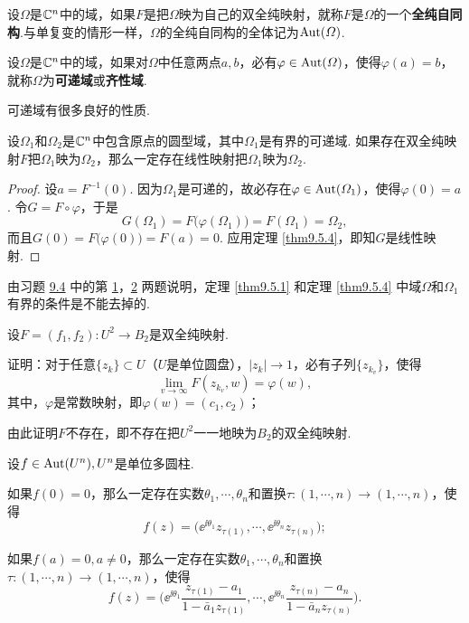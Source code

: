 设$\Omega$是$\mathbb C^n$中的域，如果$F$是把$\Omega$映为自己的双全纯映射，就称$F$是$\Omega$的一个\textbf{全纯自同构}.与单复变的情形一样，$\Omega$的全纯自同构的全体记为$\operatorname{Aut}(\varOmega)$.
\begin{definition}\label{def9.5.5}
设$\Omega$是$\mathbb C^n$中的域，如果对$\Omega$中任意两点$a,b$，必有$\varphi\in\operatorname{Aut}(\varOmega)$，使得$\varphi(a)=b$，就称$\Omega$为\textbf{可递域}或\textbf{齐性域}.
\end{definition}

可递域有很多良好的性质.
\begin{theorem}\label{thm9.5.6}
设$\Omega_1$和$\Omega_2$是$\mathbb C^n$中包含原点的圆型域，其中$\Omega_1$是有界的可递域. 如果存在双全纯映射$F$把$\Omega_1$映为$\Omega_2$，那么一定存在线性映射把$\Omega_1$映为$\Omega_2$.
\end{theorem}
\begin{proof}
设$a=F^{-1}(0)$. 因为$\Omega_1$是可递的，故必存在$\varphi\in\operatorname{Aut}(\varOmega_1)$，使得$\varphi(0)=a$. 令$G=F\circ \varphi$，于是
\[G(\Omega_1)=F\big(\varphi(\Omega_1)\big)=F(\Omega_1)=\Omega_2,\]
而且$G(0)=F\big(\varphi(0)\big)=F(a)=0$. 应用定理 \ref{thm9.5.4}，即知$G$是线性映射.
\end{proof}

\begin{xiti}
\item 由习题  \hyperlink{xiti9.4}{9.4} 中的第 \hyperlink{xiti9.4.1}{1}，\hyperlink{xiti9.4.2}{2} 两题说明，定理 \ref{thm9.5.1} 和定理 \ref{thm9.5.4} 中域$\Omega$和$\Omega_1$有界的条件是不能去掉的.
\item 设$F=(f_1,f_2):U^2\to B_2$是双全纯映射.
\begin{enuma}
  \item 证明：对于任意$\{z_k\}\subset U$（$U$是单位圆盘），$|z_k|\to1$，必有子列$\{z_{k_v}\}$，使得
      \[\lim_{v\to\infty}F(z_{k_v},w)=\varphi(w),\]
  其中，$\varphi$是常数映射，即$\varphi(w)=(c_1,c_2)$；
  \item 由此证明$F$不存在，即不存在把$U^2$一一地映为$B_2$的双全纯映射.
\end{enuma}
\item 设$f\in\operatorname{Aut}(U^n),U^n$是单位多圆柱.
\begin{enuma}
  \item 如果$f(0)=0$，那么一定存在实数$\theta_1,\cdots,\theta_n$和置换$\tau:(1,\cdots,n)\to(1,\cdots,n)$，使得
      \[f(z)=\big(\ee^{\ii\theta_1}z_{\tau(1)},\cdots,\ee^{\ii\theta_n}z_{\tau(n)}\big);\]
  \item 如果$f(a)=0,a\ne0$，那么一定存在实数$\theta_1,\cdots,\theta_n$和置换$\tau:(1,\cdots,n)\to(1,\cdots,n)$，使得
  \[f(z)=\bigg(\ee^{\ii\theta_1}\frac{z_{\tau(1)}-a_1}{1-\bar{a}_1z_{\tau(1)}},
  \cdots,\ee^{\ii\theta_n}\frac{z_{\tau(n)}-a_n}{1-\bar{a}_nz_{\tau(n)}}\bigg).\]
\end{enuma}
\end{xiti}

